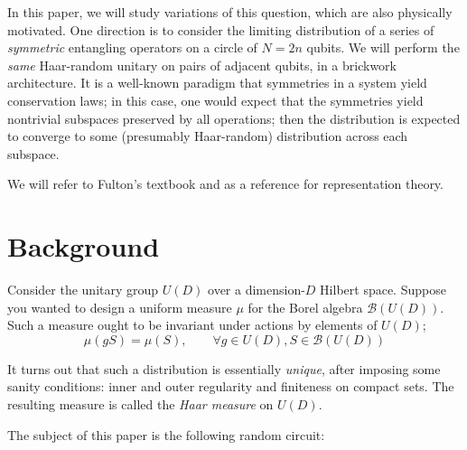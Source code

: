 \documentclass[fleqn,12pt]{article}
\begin{document}
In this paper, we will study variations of this question, which are also physically motivated.
One direction is to consider the limiting distribution of a series of \emph{symmetric}
entangling operators on a circle of $N = 2n$ qubits. We will perform the
\emph{same} Haar-random unitary on pairs of adjacent qubits, in a brickwork architecture.
It is a well-known paradigm that symmetries in a system yield conservation laws;
in this case, one would expect that the symmetries yield nontrivial subspaces preserved by
all operations; then the distribution is expected to converge to some (presumably Haar-random)
distribution across each subspace.


We will refer to Fulton's textbook \cite{fulton_harris_2004} and \cite{Etingof2009} as a
reference for representation theory.

\section{Background}

Consider the unitary group $U(D)$ over a dimension-$D$ Hilbert space.
Suppose you wanted to design a uniform measure $\mu$ for the
Borel algebra $\mathcal{B}(U(D))$. Such a measure ought to be invariant under
actions by elements of $U(D)$;
\[
    \mu(gS) = \mu(S),\qquad \forall g \in U(D), S \in \mathcal{B}(U(D))
\]

It turns out that such a distribution is essentially \emph{unique}, after imposing
some sanity conditions: inner and outer regularity and finiteness on compact sets.
The resulting measure is called the \emph{Haar measure} on $U(D)$.

The subject of this paper is the following random circuit:
\end{document}
